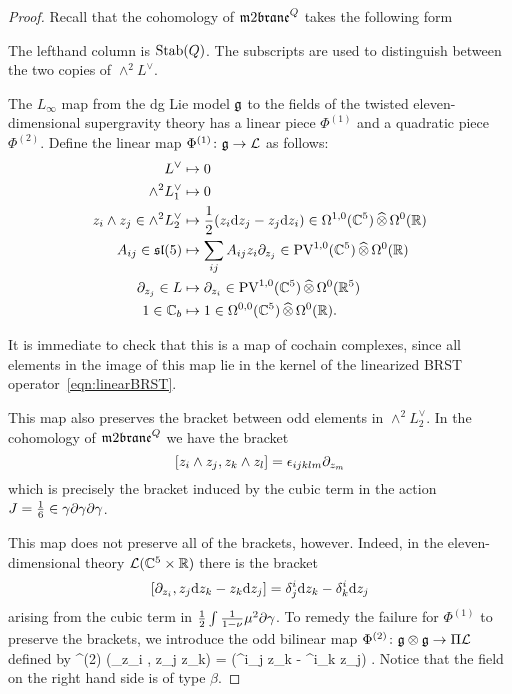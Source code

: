 \begin{proof}
Recall that the cohomology of $\m2^Q$ takes the following form
\beqn 
{}
\eeqn
The lefthand column is ${\rm Stab}(Q)$. 
The subscripts are used to distinguish between the two copies of $\wedge^2 L^\vee$.

The $L_\infty$ map from the dg Lie model $\mathfrak g$ to the fields of the twisted eleven-dimensional supergravity theory has a linear piece $\Phi^{(1)}$ and a quadratic piece $\Phi^{(2)}$.
Define the linear map $\Phi^{(1)} \colon \mathfrak g \to \mathcal L$ as follows:
\begin{align*}
 L^\vee & \mapsto 0 \\
 \wedge^2 L_1^\vee  & \mapsto 0 \\
z_i \wedge z_j \in \wedge^2 L^\vee_2 & \mapsto \frac12 (z_i \d z_j - z_j \d z_i) \in \Omega^{1,0} (\CC^5) \hotimes \Omega^0 (\RR) \\
A_{ij} \in \lie{sl}(5) & \mapsto \sum_{ij} A_{ij} z_i \partial_{z_j} \in \PV^{1,0}(\CC^5) \hotimes \Omega^0(\RR) \\ \partial_{z_j} \in L & \mapsto
\partial_{z_i} \in \PV^{1,0} (\CC^5) \hotimes \Omega^0 (\RR^5) \\ %
1 \in \CC_b & \mapsto 1 \in \Omega^{0,0}(\CC^5) \hotimes \Omega^0 (\RR) .
\end{align*}

It is immediate to check that this is a map of cochain complexes, since all elements in the image of this map lie in the kernel of the linearized BRST operator~\eqref{eqn:linearBRST}. 

This map also preserves the bracket between odd elements in $\wedge^2 L_2^\vee$. 
In the cohomology of $\m2^Q$ we have the bracket
\[
[z_i\wedge z_j , z_k \wedge z_l] = \epsilon_{ijklm} \partial_{z_m}
\]
which is precisely the bracket induced by the cubic term in the action $J = \frac16 \in \gamma \partial \gamma \partial \gamma$. 

This map does not preserve all of the brackets, however. 
Indeed, in the eleven-dimensional theory $\mathcal L(\mathbb C^5 \times \mathbb R)$ there is the bracket 
\[
\left[\partial_{z_i}, z_j {\rm d} z_k - z_k {\rm d} z_j\right] = \delta^i_j {\rm d} z_k - \delta^i_k {\rm d} z_j 
\]
arising from the cubic term in $\frac12 \int \frac{1}{1-\nu} \mu^2 \partial \gamma$. 
To remedy the failure for $\Phi^{(1)}$ to preserve the brackets, we introduce the odd bilinear map $\Phi^{(2)} \colon \mathfrak g \otimes \mathfrak g \to \Pi \mathcal L$ defined by 
\beqn\label{eqn:phi2}
\Phi^{(2)} \left(\partial_{z_i} , z_j \wedge z_k\right) =  (\delta^i_j z_k - \delta^i_k z_j) .
\eeqn
Notice that the field on the right hand side is of type $\beta$. 


\end{proof}
